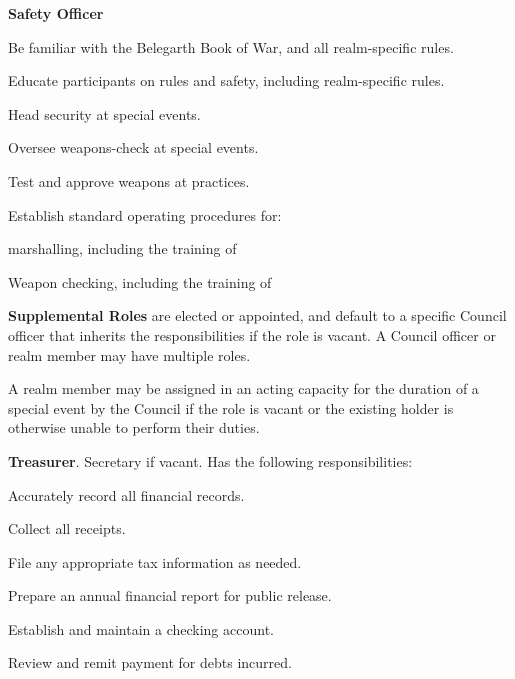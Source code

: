 \documentclass[12pt]{article}
\begin{document}
\begin{level}
\begin{level}
\begin{level}
        \end{level}
        \item \textbf{Safety Officer}
        \begin{level}
            \item Be familiar with the Belegarth Book of War, and all realm-specific rules.
            \item Educate participants on rules and safety, including realm-specific rules. 
            \item Head security at special events.
            \item Oversee weapons-check at special events.
            \item Test and approve weapons at practices.
            \item Establish standard operating procedures for:
            \begin{level}
                \item marshalling, including the training of
                \item Weapon checking, including the training of
            \end{level}
        \end{level}
\end{level}
\item \textbf{Supplemental Roles} are elected or appointed, and default to a specific Council officer that inherits the responsibilities if the role is vacant. A Council officer or realm member may have multiple roles.
\begin{level}
    \item A realm member may be assigned in an acting capacity for the duration of a special event by the Council if the role is vacant or the existing holder is otherwise unable to perform their duties.
    \item \textbf{Treasurer}. Secretary if vacant. Has the following responsibilities:
    \begin{level}
        \item Accurately record all financial records.
        \item Collect all receipts.
        \item File any appropriate tax information as needed.
        \item Prepare an annual financial report for public release.
        \item Establish and maintain a checking account.
        \item Review and remit payment for debts incurred.

\end{level}
\end{level}
\end{level}
\end{document}

